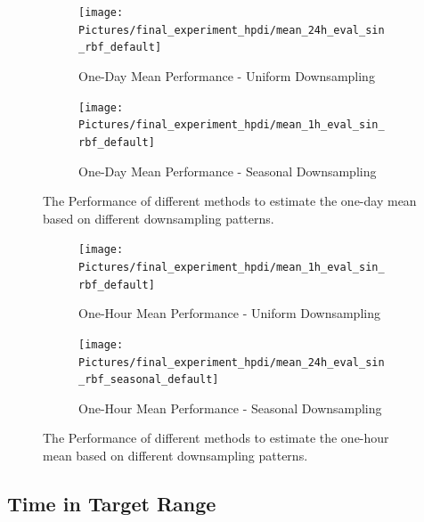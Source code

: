 \begin{figure}[!ht]
\centering
\begin{subfigure}{\textwidth}
    \centering
    \texttt{[image: Pictures/final\_experiment\_hpdi/mean\_24h\_eval\_sin\_rbf\_default]}
    \caption{One-Day Mean Performance - Uniform Downsampling}
    \label{fig:daily-mean-uniform-sampling-performance}
\end{subfigure}

\bigskip

\begin{subfigure}{\textwidth}
    \centering
    \texttt{[image: Pictures/final\_experiment\_hpdi/mean\_1h\_eval\_sin\_rbf\_default]}
    \caption{One-Day Mean Performance - Seasonal Downsampling}
    \label{fig:daily-mean-seasonal-sampling-performance}
\end{subfigure}
\caption[One-Day Mean Performance]{The Performance of different methods to
estimate the one-day mean based on different downsampling patterns.
}
\label{fig:daily-mean-performance}
\end{figure}




\begin{figure}[!ht]
\centering
\begin{subfigure}{\textwidth}
    \centering
    \texttt{[image: Pictures/final\_experiment\_hpdi/mean\_1h\_eval\_sin\_rbf\_default]}
    \caption{One-Hour Mean Performance - Uniform Downsampling}
    \label{fig:hourly-mean-uniform-sampling-performance}
\end{subfigure}

\bigskip

\begin{subfigure}{\textwidth}
    \centering
    \texttt{[image: Pictures/final\_experiment\_hpdi/mean\_24h\_eval\_sin\_rbf\_seasonal\_default]}
    \caption{One-Hour Mean Performance - Seasonal Downsampling}
    \label{fig:hourly-mean-seasonal-sampling-performance}
\end{subfigure}
\caption[One-Hour Mean Performance]{The Performance of different methods to
estimate the one-hour mean based on different downsampling patterns.
}
\label{fig:hourly-mean-performance}
\end{figure}


\subsection{Time in Target Range}

